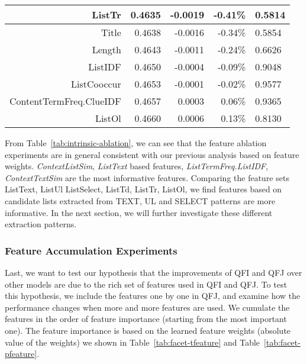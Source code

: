 \begin{table}[!htbp]
\begin{tabular}{|r|r|r|r|l|}
ListTr & 0.4635 & -0.0019 & -0.41\% & 0.5814 \\ \hline
Title & 0.4638 & -0.0016 & -0.34\% & 0.5854 \\ \hline
Length & 0.4643 & -0.0011 & -0.24\% & 0.6626 \\ \hline
ListIDF & 0.4650 & -0.0004 & -0.09\% & 0.9048 \\ \hline
ListCooccur & 0.4653 & -0.0001 & -0.02\% & 0.9577 \\ \hline
ContentTermFreq.ClueIDF & 0.4657 & 0.0003 & 0.06\% & 0.9365 \\ \hline
ListOl & 0.4660 & 0.0006 & 0.13\% & 0.8130 \\ \hline
\end{tabular}
\end{table}

From Table~\ref{tab:intrinsic-ablation}, we can see that the feature ablation experiments are in general consistent with our previous analysis based on feature weights. \textit{ContextListSim}, \textit{ListText} based features, \textit{ListTermFreq.ListIDF}, \textit{ContextTextSim} are the most informative features. Comparing the feature sets ListText, ListUl ListSelect, ListTd, ListTr, ListOl, we find features based on candidate lists extracted from TEXT, UL and SELECT patterns are more informative. In the next section, we will further investigate these different extraction patterns.


\subsubsection{Feature Accumulation Experiments}
Last, we want to test our hypothesis that the improvements of QFI and QFJ over other models are due to the rich set of features used in QFI and QFJ. To test this hypothesis, we include the features one by one in QFJ, and examine how the performance changes when more and more features are used. We cumulate the features in the order of feature importance (starting from the most important one). The feature importance is based on the learned feature weights (absolute value of the weights) we shown in Table~\ref{tab:facet-tfeature} and Table~\ref{tab:facet-pfeature}. 

